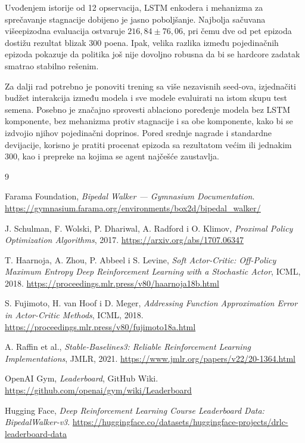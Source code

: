\documentclass[11pt,a4paper]{article}
\begin{document}
Uvođenjem istorije od 12 opservacija, LSTM enkodera i mehanizma za
sprečavanje stagnacije dobijeno je jasno poboljšanje. Najbolja sačuvana
višeepizodna evaluacija ostvaruje \(216,84\pm76,06\), pri čemu dve od pet
epizoda dostižu rezultat blizak 300 poena. Ipak, velika razlika između
pojedinačnih epizoda pokazuje da politika još nije dovoljno robusna da bi
se hardcore zadatak smatrao stabilno rešenim.

Za dalji rad potrebno je ponoviti trening sa više nezavisnih seed-ova,
izjednačiti budžet interakcija između modela i sve modele evaluirati na
istom skupu test semena. Posebno je značajno sprovesti ablaciono
poređenje modela bez LSTM komponente, bez mehanizma protiv stagnacije i
sa obe komponente, kako bi se izdvojio njihov pojedinačni doprinos.
Pored srednje nagrade i standardne devijacije, korisno je pratiti procenat
epizoda sa rezultatom većim ili jednakim 300, kao i prepreke na kojima se
agent najčešće zaustavlja.


\begin{thebibliography}{9}

Farama Foundation,
\emph{Bipedal Walker --- Gymnasium Documentation}.
\url{https://gymnasium.farama.org/environments/box2d/bipedal_walker/}

J. Schulman, F. Wolski, P. Dhariwal, A. Radford i O. Klimov,
\emph{Proximal Policy Optimization Algorithms}, 2017.
\url{https://arxiv.org/abs/1707.06347}

T. Haarnoja, A. Zhou, P. Abbeel i S. Levine,
\emph{Soft Actor-Critic: Off-Policy Maximum Entropy Deep Reinforcement
Learning with a Stochastic Actor}, ICML, 2018.
\url{https://proceedings.mlr.press/v80/haarnoja18b.html}

S. Fujimoto, H. van Hoof i D. Meger,
\emph{Addressing Function Approximation Error in Actor-Critic Methods},
ICML, 2018.
\url{https://proceedings.mlr.press/v80/fujimoto18a.html}

A. Raffin et al.,
\emph{Stable-Baselines3: Reliable Reinforcement Learning
Implementations}, JMLR, 2021.
\url{https://www.jmlr.org/papers/v22/20-1364.html}

OpenAI Gym,
\emph{Leaderboard}, GitHub Wiki.
\url{https://github.com/openai/gym/wiki/Leaderboard}

Hugging Face,
\emph{Deep Reinforcement Learning Course Leaderboard Data:
BipedalWalker-v3}.
\url{https://huggingface.co/datasets/huggingface-projects/drlc-leaderboard-data}

\end{thebibliography}
\end{document}
